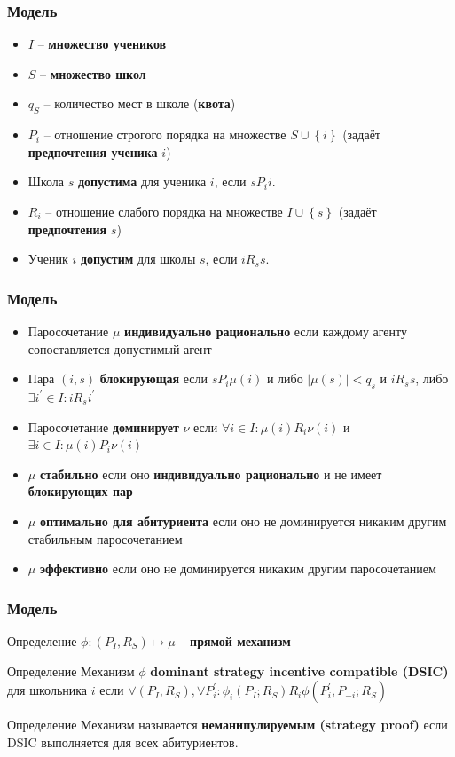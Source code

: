 \documentclass[10pt,pdf,hyperref={unicode}]{beamer}
\begin{document}
\begin{frame}
    \frametitle{Модель}
    \begin{itemize}
        \item $I$ -- {\bf множество учеников}
        \item $S$ -- {\bf множество школ}
        \item $q_S$ -- количество мест в школе ({\bf квота})
        \item $P_i$ -- отношение строгого порядка на множестве $S \cup \left\{i\right\}$ (задаёт {\bf предпочтения ученика} $i$)
        \item Школа $s$ {\bf допустима} для ученика $i$, если $s P_i i$.
        \item $R_i$ -- отношение слабого порядка на множестве $I \cup \left\{s\right\}$ (задаёт {\bf предпочтения} $s$)
        \item Ученик $i$ {\bf допустим} для школы $s$, если $i R_s s$.
    \end{itemize}
\end{frame}

\begin{frame}
    \frametitle{Модель}
    \begin{itemize}
        \item Паросочетание $\mu$ {\bf индивидуально рационально} если каждому агенту сопоставляется допустимый агент
        \item Пара $(i, s)$ {\bf блокирующая} если $s P_i \mu(i)$ и либо $|\mu(s)| < q_s$ и $i R_s s$, либо  $\exists i^\prime \in I: i R_s i^\prime$
        \item Паросочетание {\bf доминирует} $\nu$ если $\forall i \in I: \mu(i) R_i \nu(i)$ и $\exists i \in I: \mu(i) P_i \nu(i)$
        \item $\mu$ {\bf стабильно} если оно {\bf индивидуально рационально} и не имеет {\bf блокирующих пар}
        \item $\mu$ {\bf оптимально для абитуриента} если оно не доминируется никаким другим стабильным паросочетанием
        \item $\mu$ {\bf эффективно} если оно не доминируется никаким другим паросочетанием
    \end{itemize}
\end{frame}

\begin{frame}
    \frametitle{Модель}
    \begin{block}{Определение}
        $\phi: (P_I, R_S) \longmapsto \mu$ -- {\bf прямой механизм} 
    \end{block}

    \begin{block}{Определение}
        Механизм $\phi$ {\bf dominant strategy incentive compatible (DSIC)} для школьника $i$ если $\forall (P_I, R_S), \forall P_i^\prime: \phi_i(P_I; R_S) R_i \phi(P_i^\prime, P_{-i}; R_S)$
    \end{block}

    \begin{block}{Определение}
        Механизм называется {\bf неманипулируемым (strategy proof)} если DSIC выполняется для всех абитуриентов.
    \end{block}
\end{frame}
\end{document}
